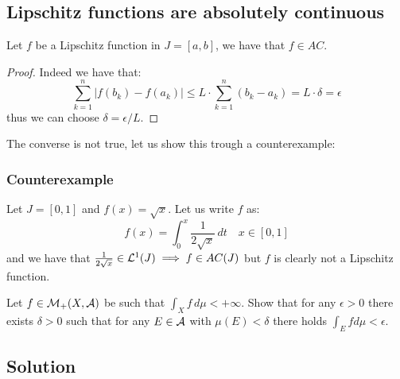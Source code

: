 \subsection{Lipschitz functions are absolutely continuous}
Let $f$ be a Lipschitz function in $J=[a,b]$, we have that $f\in AC$.\\
\begin{proof} Indeed we have that:
    \[
        \sum_{k=1}^n |f(b_k)-f(a_k)| \leq L \cdot \sum_{k=1}^n (b_k-a_k) =L \cdot \delta = \epsilon
    \]
    thus we can choose $\delta = \epsilon/L$.
\end{proof}
The converse is not true, let us show this trough a counterexample:

\subsubsection{Counterexample}
Let $J=[0,1]$ and $f(x)=\sqrt{x}$. Let us write $f$ as:
\[
    f(x) = \int_0^x \frac{1}{2\sqrt{x}} \, dt  \quad x\in[0,1]    
\]
and we have that $\frac{1}{2\sqrt{x}}\in\mathcal{L}^1(J)\implies f \in AC(J)$ but $f$ is clearly not a Lipschitz function.


\question
Let $f \in \mathcal{M}_+(X, \mathcal{A})$ be such that $\int_X f \, d\mu < +\infty$. Show that for any $\epsilon > 0$ there exists $\delta > 0$ such that for any $E \in \mathcal{A}$ with $\mu(E) < \delta$ there holds $\int_E f d\mu < \epsilon$.

\subsection*{Solution}

